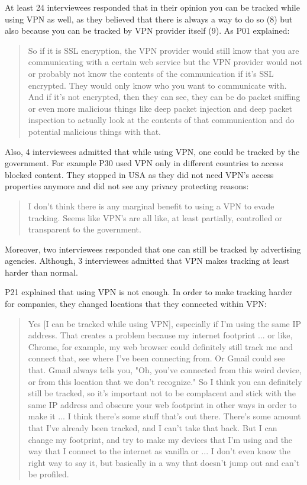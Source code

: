 At least 24 interviewees responded that in their opinion you can be tracked while using VPN as well, as they believed that there is always a way to do so (8) but also because you can be tracked by VPN provider itself (9). 
As P01 explained:

\begin{quote}So if it is SSL encryption, the VPN provider would still know that you are communicating with a certain web service but the VPN provider would not or probably not know the contents of the communication if it's SSL encrypted. They would only know who you want to communicate with. And if it's not encrypted, then they can see, they can be do packet sniffing or even more malicious things like deep packet injection and deep packet inspection to actually look at the contents of that communication and do potential malicious things with that. \end{quote}

Also, 4 interviewees admitted that while using VPN, one could be tracked by the government. For example P30 used VPN only in different countries to access blocked content. They stopped in USA as they did not need VPN's access properties anymore and did not see any privacy protecting reasons:

\begin{quote}I don't think there is any marginal benefit to using a VPN to evade tracking. Seems like VPN's are all like, at least partially, controlled or transparent to the government.\end{quote}

 Moreover, two interviewees responded that one can still be tracked by advertising agencies. Although, 3 interviewees admitted that VPN makes tracking at least harder than normal. 

P21 explained that using VPN is not enough. In order to make tracking harder for companies, they changed locations that they connected within VPN:
\begin{quote}Yes [I can be tracked while using VPN], especially if I'm using the same IP address. That creates a problem because my internet footprint ... or like, Chrome, for example, my web browser could definitely still track me and connect that, see where I've been connecting from. Or Gmail could see that. Gmail always tells you, "Oh, you've connected from this weird device, or from this location that we don't recognize." So I think you can definitely still be tracked, so it's important not to be complacent and stick with the same IP address and obscure your web footprint in other ways in order to make it ... I think there's some stuff that's out there. There's some amount that I've already been tracked, and I can't take that back. But I can change my footprint, and try to make my devices that I'm using and the way that I connect to the internet as vanilla or ... I don't even know the right way to say it, but basically in a way that doesn't jump out and can't be profiled.\end{quote}


